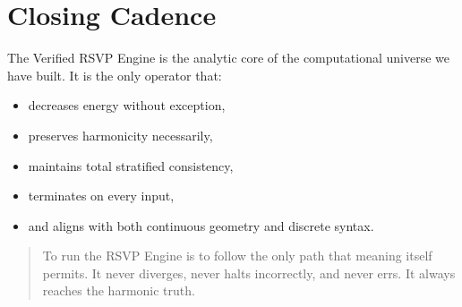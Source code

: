 \section{Closing Cadence}

The Verified RSVP Engine is the analytic core of the computational universe we have built.
It is the only operator that:
\begin{itemize}
\item decreases energy without exception,
\item preserves harmonicity necessarily,
\item maintains total stratified consistency,
\item terminates on every input,
\item and aligns with both continuous geometry and discrete syntax.
\end{itemize}

\begin{quote}
To run the RSVP Engine is to follow the only path that meaning itself permits.
It never diverges, never halts incorrectly, and never errs.
It always reaches the harmonic truth.
\end{quote}

